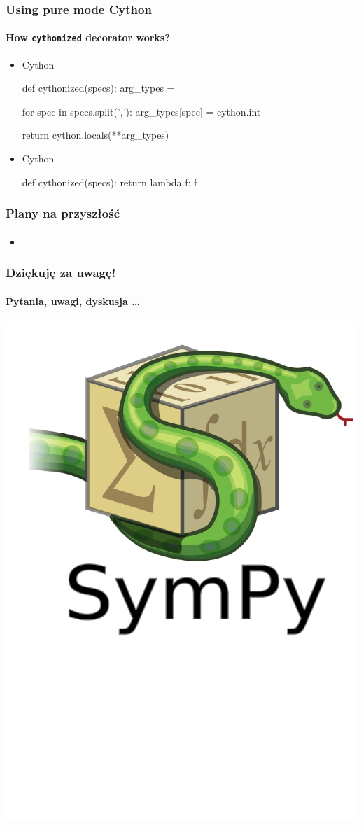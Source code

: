 \documentclass[10pt,polish]{beamer}
\begin{document}
\begin{frame}[fragile]
    \frametitle{Using pure mode Cython}
    \framesubtitle{How \texttt{cythonized} decorator works?}

    \begin{itemize}
        \item {} Cython
            \begin{python}
def cythonized(specs):
    arg_types = {}

    for spec in specs.split(','):
        arg_types[spec] = cython.int

    return cython.locals(**arg_types)
            \end{python}
        \pause
        \item {} Cython
            \begin{python}
def cythonized(specs):
    return lambda f: f
            \end{python}
    \end{itemize}
\end{frame}

\begin{frame}
    \frametitle{Plany na przyszłość}
    \framesubtitle{}

    \begin{itemize}
        \item
    \end{itemize}
\end{frame}

\begin{frame}
    \frametitle{Dziękuję za uwagę!}
    \framesubtitle{Pytania, uwagi, dyskusja \ldots}

    \begin{center}
        \includegraphics[scale=0.2]{images/sympy-logo.pdf}
    \end{center}
\end{frame}
\end{document}
